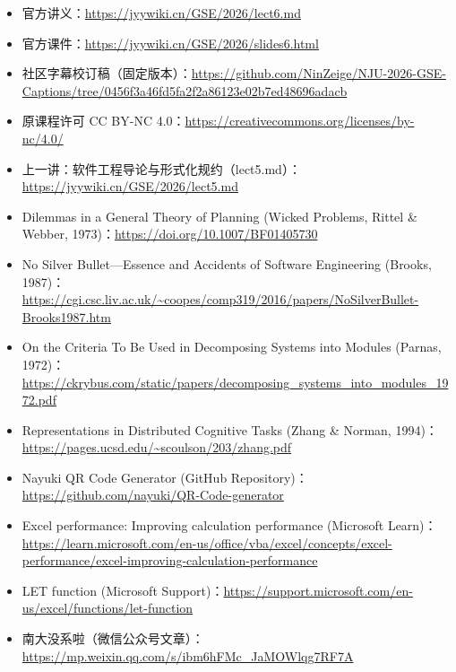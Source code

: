 \documentclass[UTF8,a4paper,11pt,fontset=fandol]{ctexart}
\begin{document}
\begin{itemize}

\item 官方讲义：\url{https://jyywiki.cn/GSE/2026/lect6.md}

\item 官方课件：\url{https://jyywiki.cn/GSE/2026/slides6.html}

\item 社区字幕校订稿（固定版本）：\url{https://github.com/NinZeige/NJU-2026-GSE-Captions/tree/0456f3a46fd5fa2f2a86123e02b7ed48696adacb}

\item 原课程许可 CC BY-NC 4.0：\url{https://creativecommons.org/licenses/by-nc/4.0/}

\item 上一讲：软件工程导论与形式化规约（lect5.md）：\url{https://jyywiki.cn/GSE/2026/lect5.md}

\item Dilemmas in a General Theory of Planning (Wicked Problems, Rittel \& Webber, 1973)：\url{https://doi.org/10.1007/BF01405730}

\item No Silver Bullet—Essence and Accidents of Software Engineering (Brooks, 1987)：\url{https://cgi.csc.liv.ac.uk/~coopes/comp319/2016/papers/NoSilverBullet-Brooks1987.htm}

\item On the Criteria To Be Used in Decomposing Systems into Modules (Parnas, 1972)：\url{https://ckrybus.com/static/papers/decomposing_systems_into_modules_1972.pdf}

\item Representations in Distributed Cognitive Tasks (Zhang \& Norman, 1994)：\url{https://pages.ucsd.edu/~scoulson/203/zhang.pdf}

\item Nayuki QR Code Generator (GitHub Repository)：\url{https://github.com/nayuki/QR-Code-generator}

\item Excel performance: Improving calculation performance (Microsoft Learn)：\url{https://learn.microsoft.com/en-us/office/vba/excel/concepts/excel-performance/excel-improving-calculation-performance}

\item LET function (Microsoft Support)：\url{https://support.microsoft.com/en-us/excel/functions/let-function}

\item 南大没系啦（微信公众号文章）：\url{https://mp.weixin.qq.com/s/ibm6hFMc_JaMOWlqg7RF7A}


\end{itemize}
\end{document}
